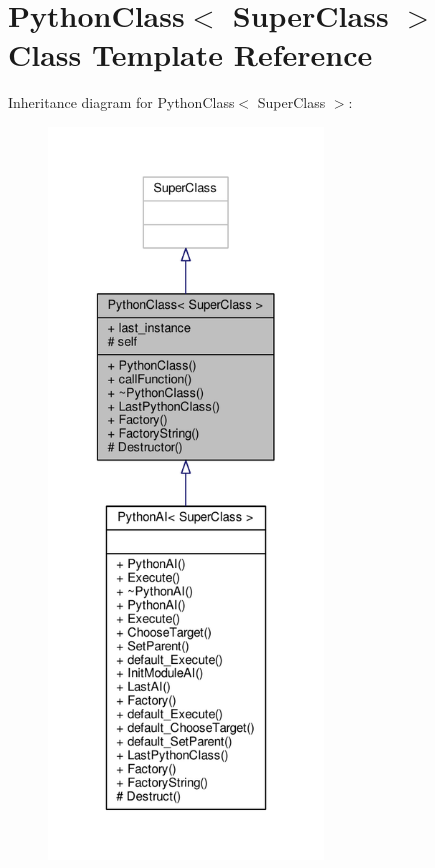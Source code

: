 \hypertarget{classPythonClass}{}\section{Python\+Class$<$ Super\+Class $>$ Class Template Reference}
\label{classPythonClass}


Inheritance diagram for Python\+Class$<$ Super\+Class $>$\+:
\nopagebreak
\begin{figure}[H]
\begin{center}
\leavevmode
\includegraphics[height=550pt]{d3/dbe/classPythonClass__inherit__graph}
\end{center}
\end{figure}


